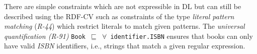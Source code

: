 \documentclass[a4paper,fontsize=11pt]{scrartcl}
\newcommand{\tb}[1]{\todo[size=\small, color=green!40]{\textbf{Thomas:} #1}}
\newcommand{\ms}[1]{\texttt{#1}}
\begin{document}
There are simple constraints which are not expressible in DL but can still be described using the RDF-CV such as constraints of the type \emph{literal pattern matching} (\emph{R-44}) which restrict literals to match given patterns. The \emph{universal quantification (R-91)} {\small\ms{Book $\sqsubseteq$ $\forall$ identifier.ISBN}} ensures that books can only have valid \emph{ISBN} identifiers, i.e., strings that match a given regular expression.
%
\end{document}
